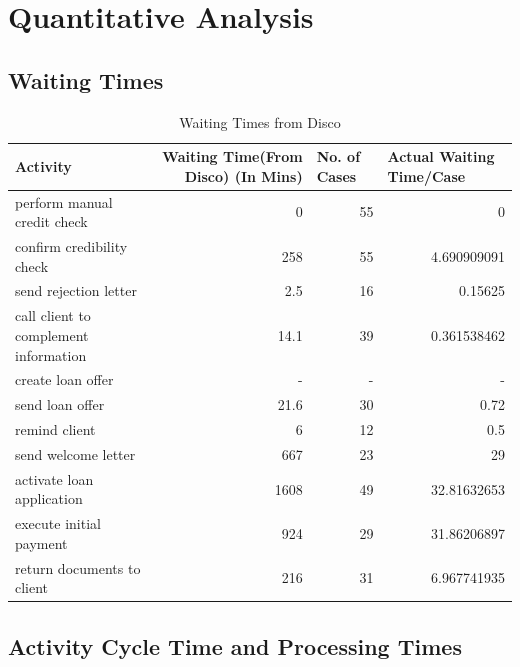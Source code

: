 \documentclass[a4paper]{article} %
\begin{document}
\section{Quantitative Analysis}
\subsection{Waiting Times}
\begin{table}[H]
  \centering
  
    \begin{tabular}{|l|r|r|r|}
    \hline
    Activity & \multicolumn{1}{p{9.355em}|}{Waiting Time\newline{}(From Disco) (In Mins)} & \multicolumn{1}{l|}{No. of Cases} & \multicolumn{1}{l|}{Actual Waiting Time/Case} \bigstrut\\
    \hline
    perform manual credit check & 0     & 55    & 0 \bigstrut\\
    \hline
    confirm credibility check & 258   & 55    & 4.690909091 \bigstrut\\
    \hline
    send rejection letter & 2.5   & 16    & 0.15625 \bigstrut\\
    \hline
    call client to complement information & 14.1  & 39    & 0.361538462 \bigstrut\\
    \hline
    create loan offer & -     & -     & - \bigstrut\\
    \hline
    send loan offer & 21.6  & 30    & 0.72 \bigstrut\\
    \hline
    remind client & 6     & 12    & 0.5 \bigstrut\\
    \hline
    send welcome letter & 667   & 23    & 29 \bigstrut\\
    \hline
    activate loan application & 1608  & 49    & 32.81632653 \bigstrut\\
    \hline
    execute initial payment & 924   & 29    & 31.86206897 \bigstrut\\
    \hline
    return documents to client & 216   & 31    & 6.967741935 \bigstrut\\
    \hline
    \end{tabular}%
    \caption{Waiting Times from Disco}
  \label{tab:wait_time_from_disco}%
\end{table}%


\subsection{Activity Cycle Time and Processing Times}
\end{document}
